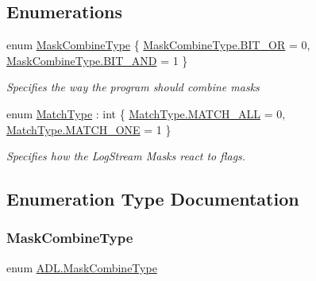 \subsection*{Enumerations}
\begin{DoxyCompactItemize}
\item 
enum \mbox{\hyperlink{namespace_a_d_l_a887d1db091d273083278875e32842128}{Mask\+Combine\+Type}} \{ \mbox{\hyperlink{namespace_a_d_l_a887d1db091d273083278875e32842128a377da01fa3eaa9e9d6a69a2fa415fe7b}{Mask\+Combine\+Type.\+B\+I\+T\+\_\+\+OR}} = 0, 
\mbox{\hyperlink{namespace_a_d_l_a887d1db091d273083278875e32842128a4bece6f4e59c0e3f185e3003dfd37b1d}{Mask\+Combine\+Type.\+B\+I\+T\+\_\+\+A\+ND}} = 1
 \}
\begin{DoxyCompactList}\small\item\em Specifies the way the program should combine masks \end{DoxyCompactList}\item 
enum \mbox{\hyperlink{namespace_a_d_l_af6334296dbae0383a652317263f0bc05}{Match\+Type}} \+: int \{ \mbox{\hyperlink{namespace_a_d_l_af6334296dbae0383a652317263f0bc05a627c7991c5d0265194247e92fcf120b0}{Match\+Type.\+M\+A\+T\+C\+H\+\_\+\+A\+LL}} = 0, 
\mbox{\hyperlink{namespace_a_d_l_af6334296dbae0383a652317263f0bc05ae732aeff37126a99228f0e497f1beb04}{Match\+Type.\+M\+A\+T\+C\+H\+\_\+\+O\+NE}} = 1
 \}
\begin{DoxyCompactList}\small\item\em Specifies how the Log\+Stream Masks react to flags. \end{DoxyCompactList}\end{DoxyCompactItemize}


\subsection{Enumeration Type Documentation}
\mbox{\label{namespace_a_d_l_a887d1db091d273083278875e32842128}} 
\subsubsection{\texorpdfstring{Mask\+Combine\+Type}{MaskCombineType}}
{\footnotesize\ttfamily enum \mbox{\hyperlink{namespace_a_d_l_a887d1db091d273083278875e32842128}{A\+D\+L.\+Mask\+Combine\+Type}}\hspace{0.3cm}{\ttfamily [strong]}}



